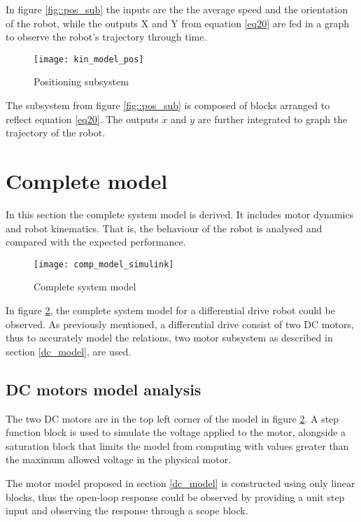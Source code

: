 In figure \ref{fig::pos_sub} the inputs are the the average speed and the orientation of the robot, while the outputs X and Y from equation \ref{eq20} are fed in a graph to observe the robot's trajectory through time. 

\begin{figure}[h]
\centering
\texttt{[image: kin\_model\_pos]}
\caption{Positioning subsystem}
\label{fig::pos_model}
\end{figure} 

The subsystem from figure \ref{fig::pos_sub} is composed of blocks arranged to reflect equation \ref{eq20}. The outputs $\dot{x}$ and $\dot{y}$ are further integrated to graph the trajectory of the robot. \\

\section{Complete model}

In this section the complete system model is derived. It includes motor dynamics and robot kinematics. That is, the behaviour of the robot is analysed and compared with the expected performance.

\begin{figure}[h]
\centering
\texttt{[image: comp\_model\_simulink]}
\caption{Complete system model}
\label{fig::com_model}
\end{figure} 

In figure \ref{fig::com_model}, the complete system model for a differential drive robot could be observed. As previously mentioned, a differential drive consist of two DC motors, thus to accurately model the relations, two motor subsystem as described in section \ref{dc_model}, are used. 

\subsection{DC motors model analysis} 

The two DC motors are in the top left corner of the model in figure \ref{fig::com_model}. A step function block is used to simulate the voltage applied to the motor, alongside a saturation block that limits the model from  computing with values greater than the maximum allowed voltage in the physical motor. 

The motor model proposed in section \ref{dc_model} is constructed using only linear blocks, thus the open-loop response could be observed by providing a unit step input and observing the response through a scope block. 

